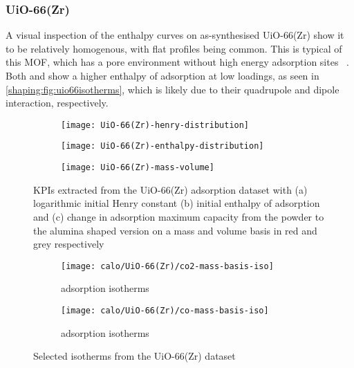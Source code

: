 
\subsubsection{UiO-66(Zr)}

A visual inspection of the enthalpy curves on as-synthesised UiO-66(Zr)
show it to be relatively homogenous, with flat
profiles being common. This is typical of this MOF, which has
a pore environment without high energy adsorption sites
~\cite{wiersumEvaluationUiO66GasBased2011}.
Both  and  show a higher enthalpy of adsorption
at low loadings, as seen in \autoref{shaping:fig:uio66isotherms},
which is likely due to their quadrupole and dipole interaction,
respectively.

\begin{figure}[p!]
	\centering
	\begin{subfigure}{\linewidth}
		\parbox[c]{0.1\linewidth}{\caption{}%
			\label{shaping:fig:analysisuio66henry}}%
		\parbox[b]{0.8\linewidth}{%
			\texttt{[image: UiO-66(Zr)-henry-distribution]}%
		}%
	\end{subfigure}%

	\begin{subfigure}{\linewidth}
		\parbox[c]{0.1\linewidth}{\caption{}%
			\label{shaping:fig:analysisuio66enth}}%
		\parbox[b]{0.8\linewidth}{%
			\texttt{[image: UiO-66(Zr)-enthalpy-distribution]}%
		}%
	\end{subfigure}%

	\begin{subfigure}{\linewidth}
		\parbox[c]{0.1\linewidth}{\caption{}%
			\label{shaping:fig:analysisuio66basis}}%
		\parbox[b]{0.8\linewidth}{%
			\texttt{[image: UiO-66(Zr)-mass-volume]}%
		}%
	\end{subfigure}%

	\caption{KPIs extracted from the UiO-66(Zr) adsorption dataset with
		(a) logarithmic initial Henry constant (b) initial enthalpy of
        adsorption and (c) change in adsorption maximum capacity from 
        the powder to the alumina shaped version on a mass and volume 
        basis in red and grey respectively}%
	\label{shaping:fig:analysisuio66}
\end{figure}

\begin{figure}[htb]
	\centering
	\begin{subfigure}{0.45\textwidth}
		\texttt{[image: calo/UiO-66(Zr)/co2-mass-basis-iso]}
		\caption{ adsorption isotherms}%
		\label{shaping:fig:uio66co2ads}
	\end{subfigure}%
	\begin{subfigure}{0.45\textwidth}
		\texttt{[image: calo/UiO-66(Zr)/co-mass-basis-iso]}
		\caption{ adsorption isotherms}%
		\label{shaping:fig:uio66coads}
	\end{subfigure}%
	\caption{Selected isotherms from the UiO-66(Zr) dataset}%
	\label{shaping:fig:uio66isotherms}
\end{figure}

